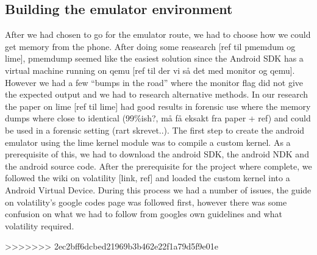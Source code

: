 \subsection{Building the emulator environment}
After we had chosen to go for the emulator route, we had to choose how we could get memory from the phone. After doing some reasearch [ref til pmemdum og lime], pmemdump seemed like the easiest solution since the Android SDK has a virtual machine running on qemu [ref til der vi så det med monitor og qemu]. However we had a few “bumps in the road” where the monitor flag did not give the expected output and we had to research alternative methods. In our research the paper on lime [ref til lime] had good results in forensic use where the memory dumps where close to identical (99\%ish?, må få eksakt fra paper + ref) and could be used in a forensic setting (rart skrevet..). 
The first step to create the android emulator using the lime kernel module was to compile a custom kernel. As a prerequisite of this, we had to download the android SDK, the android NDK and the android source code. After the prerequisite for the project where complete, we followed the wiki on volatility [link, ref] and loaded the custom kernel into a Android Virtual Device. During this process we had a number of issues, the guide on volatility’s google codes page was followed first, however there was some confusion on what we had to follow from googles own guidelines and what volatility required.


>>>>>>> 2ec2bff6dcbed21969b3b462e22f1a79d5f9e01e

